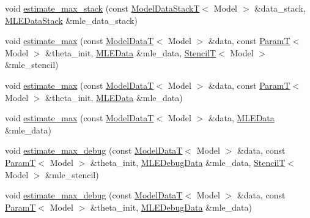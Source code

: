 \begin{DoxyCompactItemize}
\item 
void \hyperlink{classmappel_1_1estimator_1_1Estimator_aba9d96880ade861e4086b5c2cbde46b1}{estimate\+\_\+max\+\_\+stack} (const \hyperlink{namespacemappel_aaeb6665bc57476dd93c2df6ad8bc4768}{Model\+Data\+StackT}$<$ Model $>$ \&data\+\_\+stack, \hyperlink{namespacemappel_1_1estimator_structmappel_1_1estimator_1_1MLEDataStack}{M\+L\+E\+Data\+Stack} \&mle\+\_\+data\+\_\+stack)
\item 
void \hyperlink{classmappel_1_1estimator_1_1Estimator_a14b53d2ddc3d74a5653f71e4b5a97968}{estimate\+\_\+max} (const \hyperlink{namespacemappel_a97f050df953605381ae9c901c3b125f1}{Model\+DataT}$<$ Model $>$ \&data, const \hyperlink{namespacemappel_a667925cb0d6c0e49f2f035cc5a9a6857}{ParamT}$<$ Model $>$ \&theta\+\_\+init, \hyperlink{namespacemappel_1_1estimator_structmappel_1_1estimator_1_1MLEData}{M\+L\+E\+Data} \&mle\+\_\+data, \hyperlink{namespacemappel_a3a06598240007876f8c4bf834ad86197}{StencilT}$<$ Model $>$ \&mle\+\_\+stencil)
\item 
void \hyperlink{classmappel_1_1estimator_1_1Estimator_a8e1ea0bf9ef92871618c44a4cb770cb8}{estimate\+\_\+max} (const \hyperlink{namespacemappel_a97f050df953605381ae9c901c3b125f1}{Model\+DataT}$<$ Model $>$ \&data, const \hyperlink{namespacemappel_a667925cb0d6c0e49f2f035cc5a9a6857}{ParamT}$<$ Model $>$ \&theta\+\_\+init, \hyperlink{namespacemappel_1_1estimator_structmappel_1_1estimator_1_1MLEData}{M\+L\+E\+Data} \&mle\+\_\+data)
\item 
void \hyperlink{classmappel_1_1estimator_1_1Estimator_a8785a4f0e2d96fb4d30a533dc7541342}{estimate\+\_\+max} (const \hyperlink{namespacemappel_a97f050df953605381ae9c901c3b125f1}{Model\+DataT}$<$ Model $>$ \&data, \hyperlink{namespacemappel_1_1estimator_structmappel_1_1estimator_1_1MLEData}{M\+L\+E\+Data} \&mle\+\_\+data)
\item 
void \hyperlink{classmappel_1_1estimator_1_1Estimator_aca8f7fcc8d2754f55092e1dc33cff8a9}{estimate\+\_\+max\+\_\+debug} (const \hyperlink{namespacemappel_a97f050df953605381ae9c901c3b125f1}{Model\+DataT}$<$ Model $>$ \&data, const \hyperlink{namespacemappel_a667925cb0d6c0e49f2f035cc5a9a6857}{ParamT}$<$ Model $>$ \&theta\+\_\+init, \hyperlink{namespacemappel_1_1estimator_structmappel_1_1estimator_1_1MLEDebugData}{M\+L\+E\+Debug\+Data} \&mle\+\_\+data, \hyperlink{namespacemappel_a3a06598240007876f8c4bf834ad86197}{StencilT}$<$ Model $>$ \&mle\+\_\+stencil)
\item 
void \hyperlink{classmappel_1_1estimator_1_1Estimator_a2cb11ee4a6b01c38064b03d761840838}{estimate\+\_\+max\+\_\+debug} (const \hyperlink{namespacemappel_a97f050df953605381ae9c901c3b125f1}{Model\+DataT}$<$ Model $>$ \&data, const \hyperlink{namespacemappel_a667925cb0d6c0e49f2f035cc5a9a6857}{ParamT}$<$ Model $>$ \&theta\+\_\+init, \hyperlink{namespacemappel_1_1estimator_structmappel_1_1estimator_1_1MLEDebugData}{M\+L\+E\+Debug\+Data} \&mle\+\_\+data)
\end{DoxyCompactItemize}

